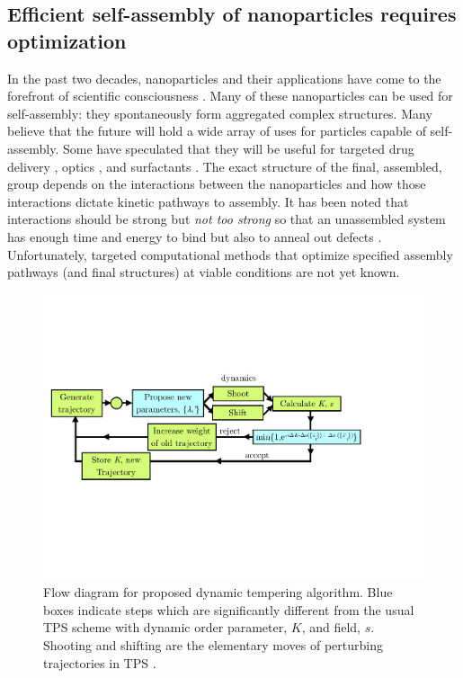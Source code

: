 \documentclass[11pt]{article}
\begin{document}
\subsection*{Efficient self-assembly of nanoparticles requires optimization}
In the past two decades, nanoparticles and their applications have come to the forefront of scientific consciousness \cite{Glotzer2007}.  Many of these nanoparticles can be used for self-assembly: they spontaneously form aggregated complex structures.  Many believe that the future will hold a wide array of uses for particles capable of self-assembly.  Some have speculated that they will be useful for targeted drug delivery \cite{Rosler2001}, optics \cite{Jiang2007}, and surfactants \cite{Glotzer2007}.  The exact structure of the final, assembled, group depends on the interactions between the nanoparticles and how those interactions dictate kinetic pathways to assembly. It has been noted that interactions should be strong but {\it not too strong} so that an unassembled system has enough time and energy to bind but also to anneal out defects \cite{Hagan2006, Whitelam2008}.  Unfortunately, targeted computational methods that optimize specified assembly pathways (and final structures) at viable conditions are not yet known. 

\begin{figure}[b!] %
   \centering
   \includegraphics[width=5in]{flowchart.pdf} 
   \caption{Flow diagram for proposed dynamic tempering algorithm.  Blue boxes indicate steps which are significantly different from the usual TPS scheme with dynamic order parameter, $K$, and field, $s$. Shooting and shifting are the elementary moves of perturbing trajectories in TPS \cite{Bolhuis_AnnuRevPhysChem_2002}.}
   \label{fig:flow}
\end{figure}
\end{document}
